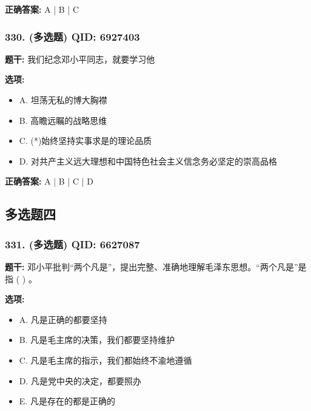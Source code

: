 \documentclass[12pt,UTF8]{ctexart}
\begin{document}
\textbf{正确答案:}
A | B | C

\vspace{0.3em}\hrulefill\vspace{0.7em}

\subsubsection*{330. (多选题) \small QID: 6927403}

\textbf{题干:}
我们纪念邓小平同志，就要学习他

\textbf{选项:}
\begin{itemize}[leftmargin=*]

  \item A. 坦荡无私的博大胸襟

  \item B. 高瞻远瞩的战略思维

  \item C. (*)始终坚持实事求是的理论品质

  \item D. 对共产主义远大理想和中国特色社会主义信念务必坚定的崇高品格

\end{itemize}

\textbf{正确答案:}
A | B | C | D

\vspace{0.3em}\hrulefill\vspace{0.7em}

\subsection*{多选题四}

\subsubsection*{331. (多选题) \small QID: 6627087}

\textbf{题干:}
邓小平批判“两个凡是”，提出完整、准确地理解毛泽东思想。“两个凡是”是指  ( )  。

\textbf{选项:}
\begin{itemize}[leftmargin=*]

  \item A. 凡是正确的都要坚持

  \item B. 凡是毛主席的决策，我们都要坚持维护

  \item C. 凡是毛主席的指示，我们都始终不渝地遵循

  \item D. 凡是党中央的决定，都要照办

  \item E. 凡是存在的都是正确的

\end{itemize}
\end{document}
